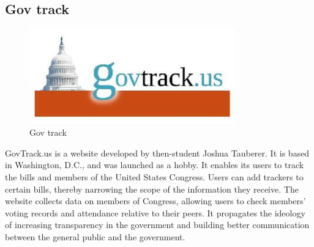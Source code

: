 \documentclass[conference]{IEEEtran}
\begin{document}
\subsection{Gov track}
  \begin{figure}[htbp]
    \centerline{\includegraphics[width=89mm, scale=0.5]{fig/gov_track.jpg}}
    \caption{Gov track}
    \label{fig}
    \end{figure}
   
GovTrack.us is a website developed by then-student Joshua Tauberer. It is based in Washington, D.C., and was launched as a hobby. It enables its users to track the bills and members of the United States Congress. Users can add trackers to certain bills, thereby narrowing the scope of the information they receive. The website collects data on members of Congress, allowing users to check members' voting records and attendance relative to their peers. It propagates the ideology of increasing transparency in the government and building better communication between the general public and the government.
 \vspace{20mm}

 
\end{document}
